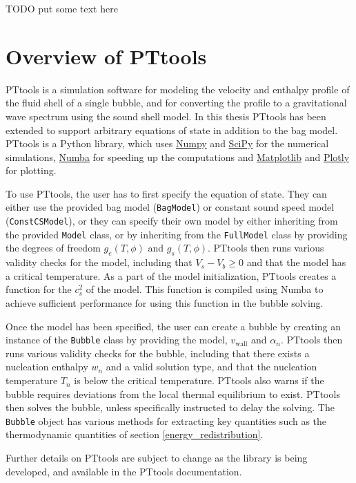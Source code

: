 TODO put some text here


\section{Overview of PTtools}
PTtools is a simulation software for modeling the velocity and enthalpy profile of the fluid shell of a single bubble,
and for converting the profile to a gravitational wave spectrum using the sound shell model.
In this thesis PTtools has been extended to support arbitrary equations of state in addition to the bag model.
PTtools is a Python library, which uses
\href{https://numpy.org/}{Numpy}
and
\href{https://scipy.org/}{SciPy}
for the numerical simulations,
\href{https://numba.pydata.org/}{Numba}
for speeding up the computations and
\href{https://matplotlib.org/}{Matplotlib}
and
\href{https://plotly.com/}{Plotly}
for plotting.

To use PTtools, the user has to first specify the equation of state.
They can either use the provided bag model (\texttt{BagModel}) or constant sound speed model (\texttt{ConstCSModel}),
or they can specify their own model by either inheriting from the provided \texttt{Model} class,
or by inheriting from the \texttt{FullModel} class by providing the degrees of freedom $g_e(T,\phi)$ and $g_s(T,\phi)$.
PTtools then runs various validity checks for the model,
including that $V_s - V_b \geq 0$ and that the model has a critical temperature.
As a part of the model initialization, PTtools creates a function for the $c_s^2$ of the model.
This function is compiled using Numba to achieve sufficient performance for using this function in the bubble solving.

Once the model has been specified,
the user can create a bubble by creating an instance of the \texttt{Bubble} class by providing the model, $v_\text{wall}$ and $\alpha_n$.
PTtools then runs various validity checks for the bubble,
including that there exists a nucleation enthalpy $w_n$ and a valid solution type,
and that the nucleation temperature $T_n$ is below the critical temperature.
PTtools also warns if the bubble requires deviations from the local thermal equilibrium to exist.
PTtools then solves the bubble, unless specifically instructed to delay the solving.
The \texttt{Bubble} object has various methods for extracting key quantities such as the thermodynamic quantities of section \ref{energy_redistribution}.

Further details on PTtools are subject to change as the library is being developed,
and available in the PTtools documentation.


